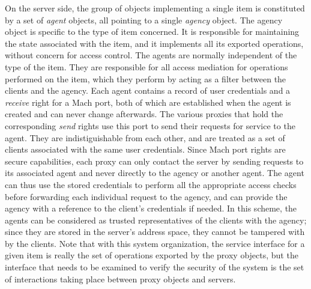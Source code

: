 
On the server side, the group of objects implementing a single item is
constituted by a set of {\em agent} objects, all pointing to a single
{\em agency} object. The agency object is specific to the type of item
concerned. It is responsible for maintaining the state associated with
the item, and it implements all its exported operations, without
concern for access control. The agents are normally independent of the
type of the item.  They are responsible for all access mediation for
operations performed on the item, which they perform by acting as a
filter between the clients and the agency. Each agent contains a
record of user credentials and a {\em receive} right for a Mach port,
both of which are established when the agent is created and can never
change afterwards. The various proxies that hold the corresponding
{\em send} rights use this port to send their requests for service to
the agent. They are indistiguishable from each other, and are treated
as a set of clients associated with the same user credentials.  Since
Mach port rights are secure capabilities, each proxy can only contact
the server by sending requests to its associated agent and never
directly to the agency or another agent. The agent can thus use the
stored credentials to perform all the appropriate access checks before
forwarding each individual request to the agency, and can provide the
agency with a reference to the client's credentials if needed. In this
scheme, the agents can be considered as trusted representatives of the
clients with the agency; since they are stored in the server's address
space, they cannot be tampered with by the clients.  Note that with
this system organization, the service interface for a given item is
really the set of operations exported by the proxy objects, but the
interface that needs to be examined to verify the security of the
system is the set of interactions taking place between proxy objects
and servers.

